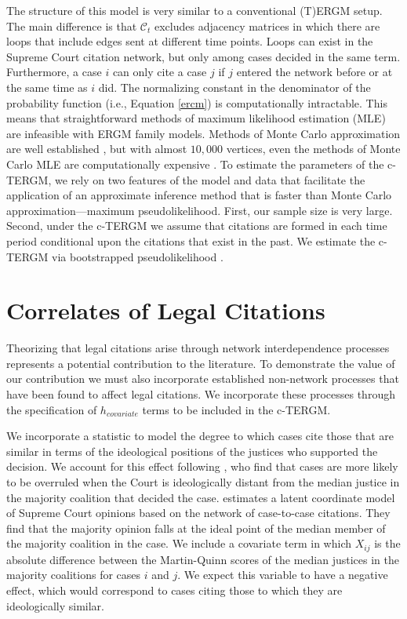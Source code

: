 \documentclass[headsepline=true, abstracton]{scrartcl}
\begin{document}
The structure of this model is very similar to a conventional (T)ERGM setup. The main difference is that  $\mathcal{C}_t$ excludes adjacency matrices in which there are loops that include edges sent at different time points. Loops can exist in the Supreme Court citation network, but only among cases decided in the same term. Furthermore, a case $i$ can only cite a case $j$ if $j$ entered the network before or at the same time as $i$ did. The normalizing constant in the denominator of the probability function (i.e., Equation \ref{ercm}) is computationally intractable. This means that straightforward methods of maximum likelihood estimation (MLE) are infeasible with ERGM family models. Methods of Monte Carlo approximation are well established \citep{hunter2006inference,van2009framework,hummel2012improving}, but with almost $10,000$ vertices, even the methods of Monte Carlo MLE are computationally expensive \citep{schmid2017exponential}. To estimate the parameters of the c-TERGM, we rely on two features of the model and data that facilitate the application of an approximate inference method that is faster than Monte Carlo approximation---maximum pseudolikelihood. First, our sample size is very large. Second, under the c-TERGM we assume that citations are formed in each time period conditional upon the citations that exist in the past.  We estimate the c-TERGM via bootstrapped pseudolikelihood \citep{desmarais2012statistical,desmarais2010consistent}. 




\section{Correlates of Legal Citations}

Theorizing that legal citations arise through network interdependence processes represents a potential contribution to the literature. To demonstrate the value of our contribution we must also incorporate established non-network processes that have been found to affect legal citations. We incorporate these processes through the specification of $h_{covariate}$  terms to be included in the c-TERGM. 

We incorporate a statistic to model the degree to which cases cite those that are similar in terms of the ideological positions of the justices who supported the decision. We account for this effect following \citet{spriggs2001explaining}, who find that cases are more likely to be overruled when the Court is ideologically distant from the median justice in the majority coalition that decided the case. \citet{clark2010locating} estimates a latent coordinate model of Supreme Court opinions based on the network of case-to-case citations. They find that the majority opinion falls at the ideal point of the median member of the majority coalition in the case. We include a covariate term in which $X_{ij}$ is the absolute difference between the Martin-Quinn scores \citep{martin2002dynamic} of the median justices in the majority coalitions for cases $i$ and $j$. We expect this variable to have a negative effect, which would correspond to cases citing those to which they are ideologically similar.%
\end{document}
